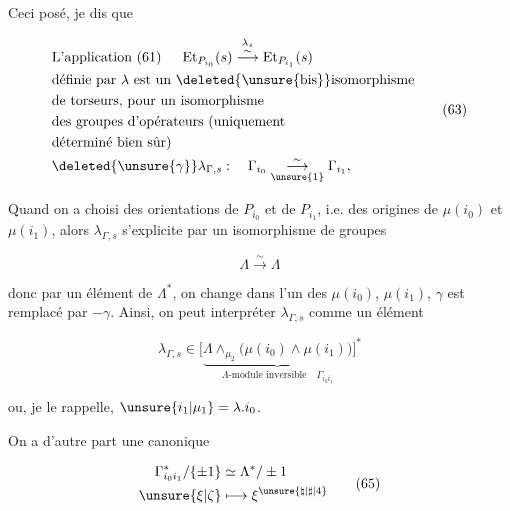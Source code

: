
Ceci posé, je dis que

\[
\begin{aligned}
 &\text{L'application (61) }\quad\operatorname{Et}_{P_{i_0}}(s)\overset{\lambda_s}{\overset{\sim}{\longrightarrow}}\operatorname{Et}_{P_{i_1}}(s)\\
 &\text{définie par }\lambda\text{ est un }\deleted{\text{\unsure{bis}}}\text{isomorphisme}\\
 &\text{de torseurs, pour un isomorphisme}\\
 &\text{des groupes d'opérateurs (uniquement}\\
 &\text{déterminé bien sûr)}\\
 &\deleted{\unsure{\gamma}}\lambda_{\Gamma,s}:\quad\Gamma_{i_0}\overset{\sim}{\underset{\unsure{1}}{\longrightarrow}}\Gamma_{i_1},
\end{aligned}\tag*{(63)}
\]


Quand on a choisi des orientations de $P_{i_0}$ et de $P_{i_1}$, i.e. des origines de $\mu(i_0)$ et $\mu(i_1)$, alors $\lambda_{\Gamma,s}$ s'explicite par un isomorphisme de groupes

\[
\Lambda\overset{\sim}{\longrightarrow}\Lambda
\]

donc par un élément \inserted{$\gamma$} de $\Lambda^*$,  on change  dans l'un des  $\mu(i_0)$, $\mu(i_1)$,  $\gamma$ est remplacé par $-\gamma$. Ainsi, on peut interpréter $\lambda_{\Gamma,s}$ comme un élément

\[
\lambda_{\Gamma,s}\in\bigl[\underbrace{\Lambda\wedge_{\mu_2}\bigl(\mu(i_0)\wedge\mu(i_1)\bigr)}_{\text{$\Lambda$-module inversible}\quad\Gamma_{i_0i_1}}\bigr]^{*}\tag*{(64)}
\]

ou, je le rappelle, $\unsure{i_1|\mu_1}=\lambda.i_0$.

On a d'autre part une   canonique

\[
\begin{aligned}
 \Gamma_{i_0i_1}^{*}/\{\pm1\}&\simeq\Lambda^*/\pm1\\
 \unsure{\xi|\zeta}&\longmapsto \xi^{\unsure{\natural|\sharp|4}}
\end{aligned}\tag*{(65)}
\]
